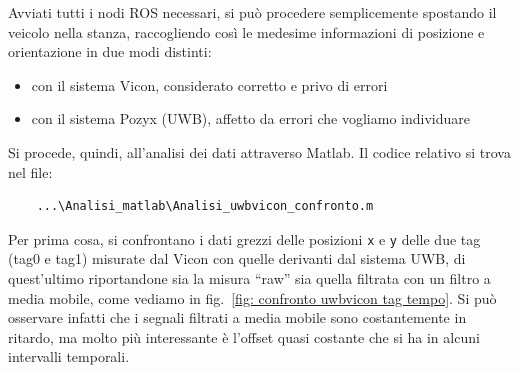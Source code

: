 Avviati tutti i nodi ROS necessari, si può procedere semplicemente spostando il veicolo nella stanza, raccogliendo così le medesime informazioni di posizione e orientazione in due modi distinti: 
\begin{itemize}
	\item con il sistema Vicon, considerato corretto e privo di errori
	\item con il sistema Pozyx (UWB), affetto da errori che vogliamo individuare
\end{itemize}

Si procede, quindi, all'analisi dei dati attraverso Matlab. 
Il codice relativo si trova nel file:
\begin{verbatim}
	...\Analisi_matlab\Analisi_uwbvicon_confronto.m
\end{verbatim}  

Per prima cosa, si confrontano i dati grezzi delle posizioni \verb|x| e \verb|y| delle due tag (tag0 e tag1) misurate dal Vicon con quelle derivanti dal sistema UWB, di quest'ultimo riportandone sia la misura ``raw'' sia quella filtrata con un filtro a media mobile, come vediamo in fig.~\ref{fig: confronto uwbvicon tag tempo}.
Si pu\`o osservare infatti che i segnali filtrati a media mobile sono costantemente in ritardo, ma molto pi\`u interessante \`e l'offset quasi costante che si ha in alcuni intervalli temporali. 


